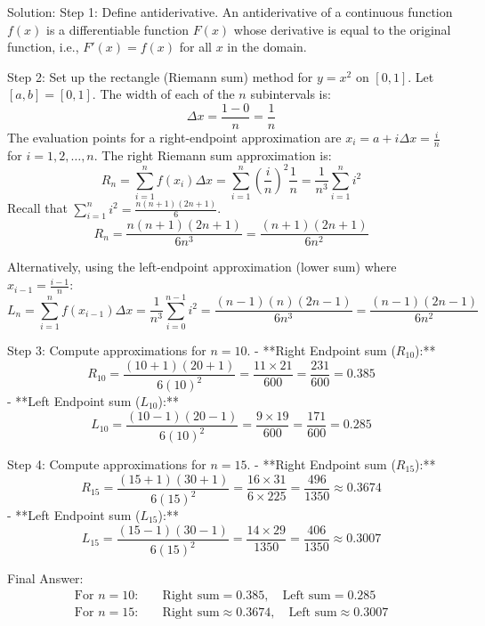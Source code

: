 \documentclass{article}
\begin{document}
Solution:
Step 1: Define antiderivative.
An antiderivative of a continuous function $f(x)$ is a differentiable function $F(x)$ whose derivative is equal to the original function, i.e., $F'(x) = f(x)$ for all $x$ in the domain.

Step 2: Set up the rectangle (Riemann sum) method for $y = x^2$ on $[0,1]$.
Let $[a, b] = [0, 1]$. The width of each of the $n$ subintervals is:
\[
\Delta x = \frac{1-0}{n} = \frac{1}{n}
\]
The evaluation points for a right-endpoint approximation are $x_i = a + i\Delta x = \frac{i}{n}$ for $i=1, 2, \dots, n$.
The right Riemann sum approximation is:
\[
R_n = \sum_{i=1}^n f(x_i) \Delta x = \sum_{i=1}^n \left(\frac{i}{n}\right)^2 \frac{1}{n} = \frac{1}{n^3} \sum_{i=1}^n i^2
\]
Recall that $\sum_{i=1}^n i^2 = \frac{n(n+1)(2n+1)}{6}$.
\[
R_n = \frac{n(n+1)(2n+1)}{6n^3} = \frac{(n+1)(2n+1)}{6n^2}
\]

Alternatively, using the left-endpoint approximation (lower sum) where $x_{i-1} = \frac{i-1}{n}$:
\[
L_n = \sum_{i=1}^n f(x_{i-1}) \Delta x = \frac{1}{n^3} \sum_{i=0}^{n-1} i^2 = \frac{(n-1)(n)(2n-1)}{6n^3} = \frac{(n-1)(2n-1)}{6n^2}
\]

Step 3: Compute approximations for $n = 10$.
- **Right Endpoint sum ($R_{10}$):**
  \[
  R_{10} = \frac{(10+1)(20+1)}{6(10)^2} = \frac{11 \times 21}{600} = \frac{231}{600} = 0.385
  \]
- **Left Endpoint sum ($L_{10}$):**
  \[
  L_{10} = \frac{(10-1)(20-1)}{6(10)^2} = \frac{9 \times 19}{600} = \frac{171}{600} = 0.285
  \]

Step 4: Compute approximations for $n = 15$.
- **Right Endpoint sum ($R_{15}$):**
  \[
  R_{15} = \frac{(15+1)(30+1)}{6(15)^2} = \frac{16 \times 31}{6 \times 225} = \frac{496}{1350} \approx 0.3674
  \]
- **Left Endpoint sum ($L_{15}$):**
  \[
  L_{15} = \frac{(15-1)(30-1)}{6(15)^2} = \frac{14 \times 29}{1350} = \frac{406}{1350} \approx 0.3007
  \]

Final Answer:
\[
\boxed{
\begin{aligned}
\text{For } n=10: & \quad \text{Right sum} = 0.385, \quad \text{Left sum} = 0.285 \\
\text{For } n=15: & \quad \text{Right sum} \approx 0.3674, \quad \text{Left sum} \approx 0.3007
\end{aligned}
}
\]

\end{document}
